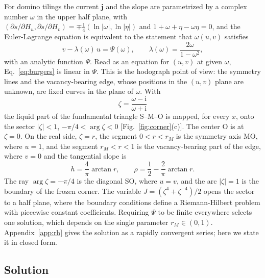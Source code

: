 \documentclass[reprint,aps,pre,superscriptaddress,longbibliography,floatfix,amsmath,amssymb]{revtex4-2}
\newcommand{\rM}{r_{M}}
\newcommand{\ii}{\mathrm{i}}
\begin{document}
For domino tilings the current $\bm j$ and the slope are parametrized by a complex number $\omega$ in the upper half plane, with $(\partial s/\partial H_u,\partial s/\partial H_v)=\mp\tfrac14(\ln|\omega|,\ln|\eta|)$ and $1+\omega+\eta-\omega\eta=0$, and the Euler-Lagrange equation is equivalent to the statement that $\omega(u,v)$ satisfies~\cite{kenyon2007}
\begin{equation}\label{eq:burgers}
  v-\lambda(\omega)\,u=\Psi(\omega),\qquad \lambda(\omega)=\frac{2\omega}{1-\omega^2},
\end{equation}
with an analytic function $\Psi$. Read as an equation for $(u,v)$ at given $\omega$, Eq.~\eqref{eq:burgers} is linear in $\Psi$. This is the hodograph point of view: the symmetry lines and the vacancy-bearing edge, whose positions in the $(u,v)$ plane are unknown, are fixed curves in the plane of $\omega$. With
\begin{equation}\label{eq:zeta}
  \zeta=\frac{\omega-\ii}{\omega+\ii}
\end{equation}
the liquid part of the fundamental triangle S--M--O is mapped, for every $x$, onto the sector $|\zeta|<1$, $-\pi/4<\arg\zeta<0$ [Fig.~\ref{fig:corner}(c)]. The center O is at $\zeta=0$. On the real side, $\zeta=r$, the segment $0<r<\rM$ is the symmetry axis MO, where $u=1$, and the segment $\rM<r<1$ is the vacancy-bearing part of the edge, where $v=0$ and the tangential slope is
\begin{equation}\label{eq:hr}
  h=\frac4\pi\arctan r ,\qquad \rho=\frac12-\frac2\pi\arctan r .
\end{equation}
The ray $\arg\zeta=-\pi/4$ is the diagonal SO, where $u=v$, and the arc $|\zeta|=1$ is the boundary of the frozen corner. The variable $J=(\zeta^4+\zeta^{-4})/2$ opens the sector to a half plane, where the boundary conditions define a Riemann-Hilbert problem with piecewise constant coefficients. Requiring $\Psi$ to be finite everywhere selects one solution, which depends on the single parameter $\rM\in(0,1)$. Appendix~\ref{app:rh} gives the solution as a rapidly convergent series; here we state it in closed form.

\subsection{Solution}
\end{document}
